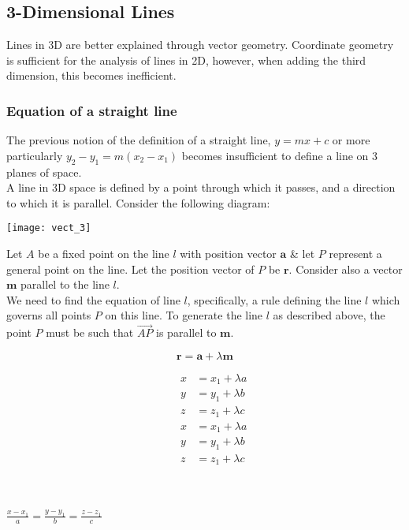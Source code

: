 \documentclass{standalone}
\begin{document}
	\subsection{3-Dimensional Lines}
	
	Lines in 3D are better explained through vector geometry. Coordinate geometry is sufficient for the analysis of lines in 2D, however, when adding the third dimension, this becomes inefficient.
	
	\subsubsection{Equation of a straight line}
	
	The previous notion of the definition of a straight line, $y=mx+c$ or more particularly $y_2-y_1 = m(x_2-x_1)$ becomes insufficient to define a line on 3 planes of space.\\
	
	A line in 3D space is defined by a point through which it passes, and a direction to which it is parallel. Consider the following diagram:
	
	
	\begin{center}
		\texttt{[image: vect\_3]}
	\end{center}
	
	
	Let $A$ be a fixed point on the line $l$ with position vector $\textbf{a}$ \& let $P$ represent a general point on the line. Let the position vector of $P$ be $\textbf{r}$. Consider also a vector $\textbf{m}$ parallel to the line $l$.\\
	
	We need to find the equation of line $l$, specifically, a rule defining the line $l$ which governs all points $P$ on this line. To generate the line $l$ as described above, the point $P$ must be such that $\overrightarrow{AP}$ is parallel to $\textbf{m}$.
	
	\begin{multicols}{3}
		$$	 \textbf{r}  = \textbf{a} + \lambda \textbf{m}$$
		
		\begin{alignat*}{2}
			&   & x & = x_1 + \lambda a \\
			&   & y & = y_1 + \lambda b \\
			&   & z & = z_1 + \lambda c 
		\end{alignat*}
		\begin{alignat*}{2}
			&   & x & = x_1 + \lambda a \\
			&   & y & = y_1 + \lambda b \\
			&   & z & = z_1 + \lambda c 
		\end{alignat*}
		\begin{center}
			~\\
			~\\
			$\frac{x-x_1}{a} = \frac{y-y_1}{b} = \frac{z-z_1}{c}$
		\end{center}
	\end{multicols}
	
\end{document}
